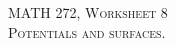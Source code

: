 \documentclass[12pt]{article} %
\begin{document}
\begin{center}
   \textsc{\large MATH 272, Worksheet 8}\\
   \textsc{Potentials and surfaces.}
\end{center}
\vspace{.5cm}
\end{document}
